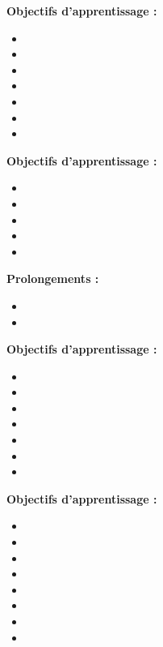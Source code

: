 \par\noindent\textbf{Objectifs d'apprentissage :}
\begin{itemize}
    \item \useobj[C4B1fa]
    \item \useobj[C4B1fb]
    \item \useobj[C4B1fc]
    \item \useobj[C4B1fd]
    \item \useobj[C4B1fe]
    \item \useobj[C4B1ff]
    \item \useobj[C4B1fg]
\end{itemize}
\endsequence

\par\noindent\textbf{Objectifs d'apprentissage :}
\begin{itemize}
    \item \useobj[C4B1ba]
    \item \useobj[C4B1bb]
    \item \useobj[C4B1bc]
    \item \useobj[C4B1bd]
    \item \useobj[C4B1bf]
\end{itemize}
\par\noindent\textbf{Prolongements :}
\begin{itemize}
    \item \usepro[C4B1ba]
    \item \usepro[C4B1bb]
\end{itemize}
\endsequence

\par\noindent\textbf{Objectifs d'apprentissage :}
\begin{itemize}
    \item \useobj[C4E1aa]
    \item \useobj[C4E1ab]
    \item \useobj[C4E1ac]
    \item \useobj[C4E1ad]
    \item \useobj[C4E1ae]
    \item \useobj[C4E1af]
    \item \useobj[C4E1ag]
\end{itemize}
\endsequence

\endlevel

\par\noindent\textbf{Objectifs d'apprentissage :}
\begin{itemize}
    \item \useobj[C4D2aa]
    \item \useobj[C4D2ab]
    \item \useobj[C4D2ac]
    \item \useobj[C4D2ad]
    \item \useobj[C4D2ae]
    \item \useobj[C4D2af]
    \item \useobj[C4D2ag]
    \item \useobj[C4D2ah]
\end{itemize}
\endsequence

